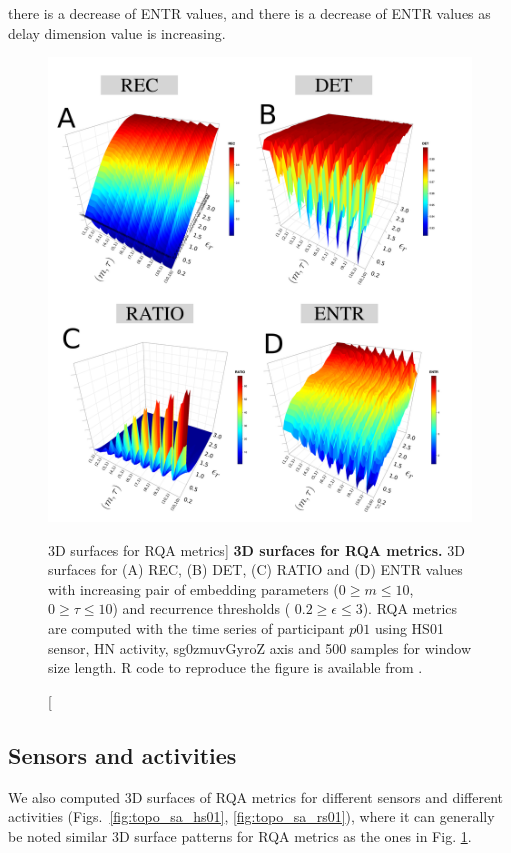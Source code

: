 there is a decrease of ENTR values, and 
there is a decrease of ENTR values as delay dimension value is increasing.
\begin{figure}
\centering
\includegraphics[width=1.0\textwidth]{rqas}
    \caption
	[3D surfaces for RQA metrics]{
	{\bf 3D surfaces for RQA metrics.}
	3D surfaces for (A) REC, (B) DET, (C) RATIO and (D) ENTR values 
	with increasing pair of embedding parameters 
	($0 \ge m \le 10$, $0 \ge \tau \le 10$) 
	and recurrence thresholds (  $ 0.2 \ge \epsilon \le 3 $).
	RQA metrics are computed with the time series of participant $p01$ using 
	HS01 sensor, HN activity, sg0zmuvGyroZ axis and 500 samples 
	for window size length.
        R code to reproduce the figure is available from \cite{hwum2018}.
	}
\label{fig:topo_rqas}
\end{figure}


\newpage
\subsection{Sensors and activities}
We also computed 3D surfaces of RQA metrics for different sensors 
and different activities 
(Figs.~\ref{fig:topo_sa_hs01}, \ref{fig:topo_sa_rs01}), where it can 
generally be noted similar 3D surface patterns for RQA metrics as the ones
in Fig. \ref{fig:topo_rqas}. 

